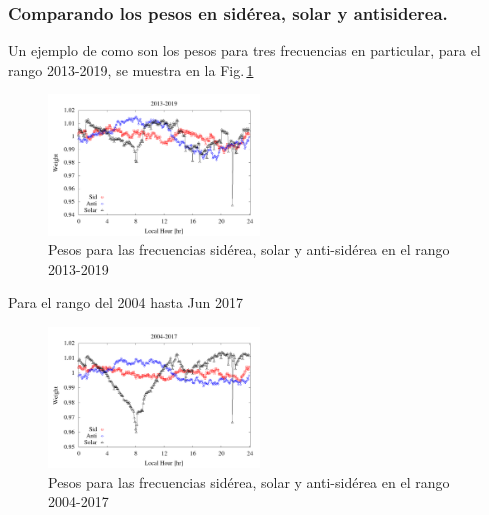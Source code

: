
\subsubsection{Comparando los pesos en sidérea, solar y antisiderea.}

Un ejemplo de como son los pesos para tres frecuencias en particular, para el rango 2013-2019, se muestra en la Fig.\,\ref{fig:pesos}


\begin{figure}[H]
	\centering
	\includegraphics[width=0.5\textwidth]{Graficos/weigth2013-2019.png}
	\caption{Pesos para las frecuencias sidérea, solar y anti-sidérea en el rango 2013-2019}
	\label{fig:pesos}
\end{figure}


Para el rango del 2004 hasta Jun 2017

\begin{figure}[H]
	\centering
	\includegraphics[width=0.5\textwidth]{Graficos/weigth2004-2017.png}
	\caption{Pesos para las frecuencias sidérea, solar y anti-sidérea en el rango 2004-2017}
	\label{fig:pesos_2017}
\end{figure}



